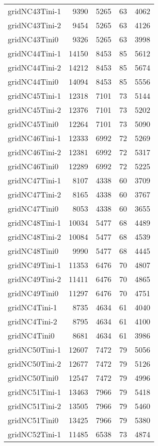 \begin{longtable}{lrrrr}
gridNC43Tini-1 & 9390 & 5265 & 63 & 4062 \\
gridNC43Tini-2 & 9454 & 5265 & 63 & 4126 \\
gridNC43Tini0 & 9326 & 5265 & 63 & 3998 \\
gridNC44Tini-1 & 14150 & 8453 & 85 & 5612 \\
gridNC44Tini-2 & 14212 & 8453 & 85 & 5674 \\
gridNC44Tini0 & 14094 & 8453 & 85 & 5556 \\
gridNC45Tini-1 & 12318 & 7101 & 73 & 5144 \\
gridNC45Tini-2 & 12376 & 7101 & 73 & 5202 \\
gridNC45Tini0 & 12264 & 7101 & 73 & 5090 \\
gridNC46Tini-1 & 12333 & 6992 & 72 & 5269 \\
gridNC46Tini-2 & 12381 & 6992 & 72 & 5317 \\
gridNC46Tini0 & 12289 & 6992 & 72 & 5225 \\
gridNC47Tini-1 & 8107 & 4338 & 60 & 3709 \\
gridNC47Tini-2 & 8165 & 4338 & 60 & 3767 \\
gridNC47Tini0 & 8053 & 4338 & 60 & 3655 \\
gridNC48Tini-1 & 10034 & 5477 & 68 & 4489 \\
gridNC48Tini-2 & 10084 & 5477 & 68 & 4539 \\
gridNC48Tini0 & 9990 & 5477 & 68 & 4445 \\
gridNC49Tini-1 & 11353 & 6476 & 70 & 4807 \\
gridNC49Tini-2 & 11411 & 6476 & 70 & 4865 \\
gridNC49Tini0 & 11297 & 6476 & 70 & 4751 \\
gridNC4Tini-1 & 8735 & 4634 & 61 & 4040 \\
gridNC4Tini-2 & 8795 & 4634 & 61 & 4100 \\
gridNC4Tini0 & 8681 & 4634 & 61 & 3986 \\
gridNC50Tini-1 & 12607 & 7472 & 79 & 5056 \\
gridNC50Tini-2 & 12677 & 7472 & 79 & 5126 \\
gridNC50Tini0 & 12547 & 7472 & 79 & 4996 \\
gridNC51Tini-1 & 13463 & 7966 & 79 & 5418 \\
gridNC51Tini-2 & 13505 & 7966 & 79 & 5460 \\
gridNC51Tini0 & 13425 & 7966 & 79 & 5380 \\
gridNC52Tini-1 & 11485 & 6538 & 73 & 4874 \\

\end{longtable}
